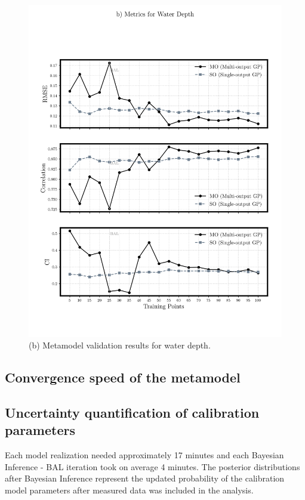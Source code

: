 \documentclass[draft,linenumbers,onecolumn]{agujournal2019} %
\begin{document}
\begin{figure}[!htbp]
\begin{minipage}[b]{0.49\textwidth}
		\includegraphics[width=\textwidth]{images/8b_meta-validation-WD.png}
		\caption{(b) Metamodel validation results for water depth.}
		\label{fig:meta_validation_wd}
	\end{minipage}
\end{figure}

\subsection{Convergence speed of the metamodel}


\subsection{Uncertainty quantification of calibration parameters}

Each model realization needed approximately 17 minutes and each Bayesian Inference - BAL iteration took on average 4 minutes. The posterior distributions after Bayesian Inference represent the updated probability of the calibration model parameters after measured data was included in the analysis.
\end{document}
